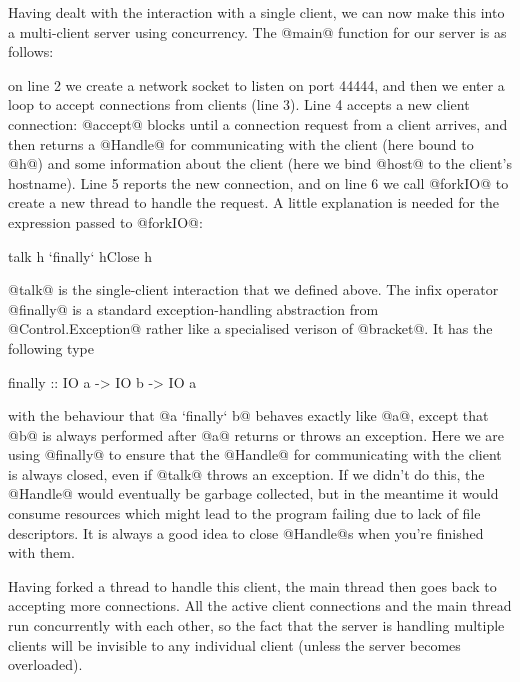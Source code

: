 Having dealt with the interaction with a single client, we can now
make this into a multi-client server using concurrency.  The @main@
function for our server is as follows:


\noindent on line 2 we create a network socket to listen on port
44444, and then we enter a loop to accept connections from clients
(line 3).  Line 4 accepts a new client connection: @accept@ blocks
until a connection request from a client arrives, and then returns a
@Handle@ for communicating with the client (here bound to @h@) and
some information about the client (here we bind @host@ to the client's
hostname).  Line 5 reports the new connection, and on line 6 we call
@forkIO@ to create a new thread to handle the request.  A little
explanation is needed for the expression passed to @forkIO@:

\begin{haskell}
   talk h `finally` hClose h
\end{haskell}

\noindent @talk@ is the single-client interaction that we defined
above.  The infix operator @finally@ is a standard exception-handling
abstraction from @Control.Exception@ rather like a specialised verison
of @bracket@.  It has the following type

\begin{haskell}
finally :: IO a -> IO b -> IO a
\end{haskell}

\noindent with the behaviour that @a `finally` b@ behaves exactly like
@a@, except that @b@ is always performed after @a@ returns or throws
an exception.  Here we are using @finally@ to ensure that the @Handle@
for communicating with the client is always closed, even if @talk@
throws an exception.  If we didn't do this, the @Handle@ would
eventually be garbage collected, but in the meantime it would consume
resources which might lead to the program failing due to lack of file
descriptors.  It is always a good idea to close @Handle@s when you're
finished with them.

Having forked a thread to handle this client, the main thread then
goes back to accepting more connections.  All the active client
connections and the main thread run concurrently with each other, so
the fact that the server is handling multiple clients will be
invisible to any individual client (unless the server becomes
overloaded).

